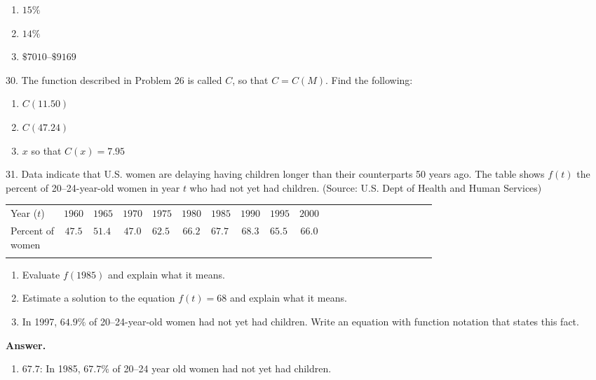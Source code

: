 \documentclass[10pt,]{book}
\makeatletter
\theoremstyle{plain}
\theoremstyle{definition}
\theoremstyle{definition}
\theoremstyle{definition}
\theoremstyle{definition}
\numberwithin{equation}{part}
\newcommand{\hrulethin}  {\noalign{\hrule height 0.04em}}
\newcommand{\hrulethick} {\noalign{\hrule height 0.11em}}
\newcommand{\tablecelllines}[3]%
{\begin{tabular}[#2]{@{}#1@{}}#3\end{tabular}}
\makeatother
\begin{document}
\begin{exerciselist}
\begin{enumerate}[label=\alph*]
\item\hypertarget{li-352}{}\(15\%\)%
\item\hypertarget{li-353}{}\(14\%\)%
\item\hypertarget{li-354}{}\(\$7010–\$9169\)%
\end{enumerate}
%
\item[30.]\hypertarget{exercise-99}{}The function described in Problem 26 is called \(C\), so that \(C = C( M)\). Find the following: \leavevmode%
\begin{enumerate}[label=\alph*]
\item\hypertarget{li-355}{}\(C(11.50)\)%
\item\hypertarget{li-356}{}\(C(47.24)\)%
\item\hypertarget{li-357}{}\(x\) so that \(C(x) = 7.95\)%
\end{enumerate}
%
\par\smallskip
\item[31.]\hypertarget{exercise-100}{}Data indicate that U.S. women are delaying having children longer than their counterparts 50 years ago. The table shows \(f(t)\) the percent of 20–24-year-old women in year \(t\) who had not yet had children. (Source: U.S. Dept of Health and Human Services) \begin{tabular}{AcAcAcAcAcAcAcAcAcAcA}\hrulethick
Year (\(t\))&\(1960\)&\(1965\)&\(1970\)&\(1975\)&\(1980\)&\(1985\)&\(1990\)&\(1995\)&\(2000\)\tabularnewline\hrulethin
\tablecelllines{c}{m}
{Percent of\\
women}
&\(47.5\)&\(51.4\)&\(47.0\)&\(62.5\)&\(66.2\)&\(67.7\)&\(68.3\)&\(65.5\)&\(66.0\)\tabularnewline\hrulethin
\end{tabular}
 \leavevmode%
\begin{enumerate}[label=\alph*]
\item\hypertarget{li-358}{}Evaluate \(f (1985)\) and explain what it means.%
\item\hypertarget{li-359}{}Estimate a solution to the equation \(f (t) = 68\) and explain what it means.%
\item\hypertarget{li-360}{}In 1997, \(64.9\%\) of 20–24-year-old women had not yet had children. Write an equation with function notation that states this fact.%
\end{enumerate}
%
\par\smallskip
\par\smallskip
\noindent\textbf{Answer.}\hypertarget{answer-59}{}\quad
\leavevmode%
\begin{enumerate}[label=\alph*]
\item\hypertarget{li-361}{}\(67.7\): In 1985, \(67.7\%\) of 20–24 year old women had not yet had children.%

\end{enumerate}
\end{exerciselist}
\end{document}
